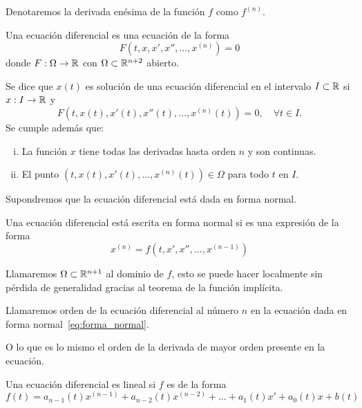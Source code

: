 \documentclass[../ecuaciones_diferenciales.tex]{subfiles}
\begin{document}
\begin{notation}
	Denotaremos la derivada enésima de la función \(f\) como \(f^{(n)}\).
\end{notation}

\begin{definition}
	Una ecuación diferencial es una ecuación de la forma
	\[F(t, x, x', x'', \dots, x^{(n)}) = 0\]
	donde \(F : \Omega \to \mathbb{R}\) con \(\Omega \subset \mathbb{R}^{n + 2}\) abierto.
\end{definition}

\begin{definition}
	Se dice que \(x(t)\) es solución de una ecuación diferencial en el intervalo
	\(I \subset \mathbb{R}\) si \(x : I \to \mathbb{R}\) y
	\[F(t, x(t), x'(t), x''(t), \dots, x^{(n)}(t)) = 0, \quad \forall t \in I.\]
	Se cumple además que:
	\begin{enumerate}[i)]
		\item La función \(x\) tiene todas las derivadas hasta orden \(n\) y son
		      continuas.

		\item El punto \((t, x(t), x'(t), \dots, x^{(n)}(t)) \in \Omega\) para
		      todo \(t\) en \(I\).
	\end{enumerate}
\end{definition}

Supondremos que la ecuación diferencial está dada en forma normal.

\begin{definition}
	Una ecuación diferencial está escrita en forma normal si es una expresión 
	de la forma
	\begin{equation} \label{eq:forma_normal}
		x^{(n)} = f(t, x', x'', \dots, x^{(n - 1)})
	\end{equation}
\end{definition}

Llamaremos \(\Omega \subset \mathbb{R}^{n + 1}\) al dominio de \(f\), esto se puede 
hacer localmente sin pérdida de generalidad gracias al teorema de la función
implícita.

\begin{definition}[Orden]
	Llamaremos orden de la ecuación diferencial al número \(n\) en
	la ecuación dada en forma normal~\ref{eq:forma_normal}.
\end{definition}

O lo que es lo mismo el orden de la derivada de mayor orden presente en la
ecuación.

\begin{definition}
	Una ecuación diferencial es lineal si \(f\) es de la forma
	\[f(t) = a_{n - 1}(t)x^{(n - 1)} + a_{n - 2}(t)x^{(n - 2)} +
		\dots + a_1(t)x' + a_0(t)x + b(t)\]
\end{definition}
\end{document}
